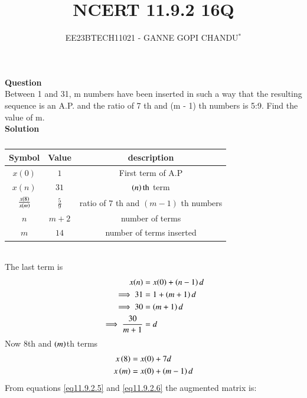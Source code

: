 \documentclass[journal,12pt,onecolumn]{IEEEtran}
\theoremstyle{remark}
\begin{document}

\vspace{3cm}
\title{NCERT 11.9.2 16Q}
\author{EE23BTECH11021 - GANNE GOPI CHANDU$^{*}$%
}
\maketitle
\bigskip
\renewcommand{\thefigure}{\theenumi}
\renewcommand{\thetable}{\theenumi}

\textbf{Question}\\
Between 1 and 31, m numbers have been inserted in such a way that the resulting sequence is an A.P. and 
the ratio of 7
th and (m - 1)
th numbers is 5:9. Find the value of m.\\
\textbf{Solution}\\
\begin{table}[!h]
\begin{center}
\renewcommand\thetable{1}
\begin{tabular}{ |c|c|c| } 
  \hline
    Symbol & Value & description \\ 
  \hline
  $x(0)$ & $1$ & First term of A.P  \\ 
  \hline
  $x(n)$ & $31$ & $\left(n\right)\text{th}$ term \\
  \hline
  $\frac{x\left(8\right)}{x\left(m\right)}$ & $\frac{5}{9}$ & ratio of $7$ th  and $(m-1)$ th numbers\\ 
  \hline
  $n$ & $m+2$ & number of terms \\
  \hline
  $m$ & $14$ & number of terms inserted \\
  \hline
\end{tabular}
\end{center}
\caption{}
\end{table}\\
The last term is
\begin{align}
x(n)&=x(0)+\left(n-1\right)d\\
\implies31 &= 1 + \left(m + 1\right)d \\
\implies30 &= \left(m + 1\right)d \\
\implies\frac{30}{m + 1} &= d \label{eq11.9.2.4}
\end{align}
Now $8$th and $\left(m\right)$th terms
\begin{align}
x\left(8\right) &= x(0) + 7d\label{eq11.9.2.5}\\
x\left(m\right) &= x(0) + \left(m-1\right)d\label{eq11.9.2.6}
\end{align}
From  equations \eqref{eq11.9.2.5} and \eqref{eq11.9.2.6} the augmented matrix is:\\
\end{document}

